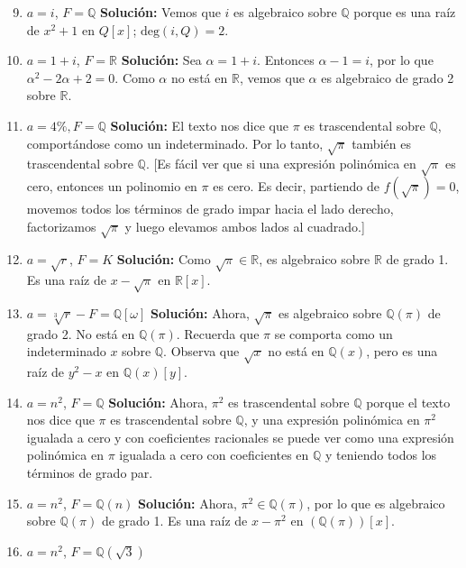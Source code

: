 \begin{enumerate}
    \setcounter{enumi}{8}
    \item $a = i$, $F = \mathbb{Q}$
    \textbf{Solución:}
    Vemos que $i$ es algebraico sobre $\mathbb{Q}$ porque es una raíz de $x^2 + 1$ en $Q[x]$; $\text{deg}(i, Q) = 2$.
    \item $a = 1 + i$, $F = \mathbb{R}$
    \textbf{Solución:}
    Sea $\alpha = 1 + i$. Entonces $\alpha - 1 = i$, por lo que $\alpha^2 - 2\alpha + 2 = 0$. Como $\alpha$ no está en $\mathbb{R}$, vemos que $\alpha$ es algebraico de grado 2 sobre $\mathbb{R}$.
    \item $a = 4\%, F = \mathbb{Q}$
    \textbf{Solución:}
    El texto nos dice que $\pi$ es trascendental sobre $\mathbb{Q}$, comportándose como un indeterminado. Por lo tanto, $\sqrt{\pi}$ también es trascendental sobre $\mathbb{Q}$. [Es fácil ver que si una expresión polinómica en $\sqrt{\pi}$ es cero, entonces un polinomio en $\pi$ es cero. Es decir, partiendo de $f(\sqrt{\pi}) = 0$, movemos todos los términos de grado impar hacia el lado derecho, factorizamos $\sqrt{\pi}$ y luego elevamos ambos lados al cuadrado.]
    \item $a = \sqrt{r}$, $F = K$
    \textbf{Solución:}
     Como $\sqrt{\pi} \in \mathbb{R}$, es algebraico sobre $\mathbb{R}$ de grado 1. Es una raíz de $x - \sqrt{\pi}$ en $\mathbb{R}[x]$.
    \item $a = \sqrt[3]{r} - F = \mathbb{Q}[\omega]$
    \textbf{Solución:}
    Ahora, $\sqrt{\pi}$ es algebraico sobre $\mathbb{Q}(\pi)$ de grado 2. No está en $\mathbb{Q}(\pi)$. Recuerda que $\pi$ se comporta como un indeterminado $x$ sobre $\mathbb{Q}$. Observa que $\sqrt{x}$ no está en $\mathbb{Q}(x)$, pero es una raíz de $y^2 - x$ en $\mathbb{Q}(x)[y]$.
    \item $a = n^2$, $F = \mathbb{Q}$
    \textbf{Solución:}
    Ahora, $\pi^2$ es trascendental sobre $\mathbb{Q}$ porque el texto nos dice que $\pi$ es trascendental sobre $\mathbb{Q}$, y una expresión polinómica en $\pi^2$ igualada a cero y con coeficientes racionales se puede ver como una expresión polinómica en $\pi$ igualada a cero con coeficientes en $\mathbb{Q}$ y teniendo todos los términos de grado par.
    \item $a = n^2$, $F = \mathbb{Q}(n)$
    \textbf{Solución:}
     Ahora, $\pi^2 \in \mathbb{Q}(\pi)$, por lo que es algebraico sobre $\mathbb{Q}(\pi)$ de grado 1. Es una raíz de $x - \pi^2$ en $\left(\mathbb{Q}(\pi)\right)[x]$.
    \item $a = n^2$, $F = \mathbb{Q}(\sqrt{3})$

\end{enumerate}

